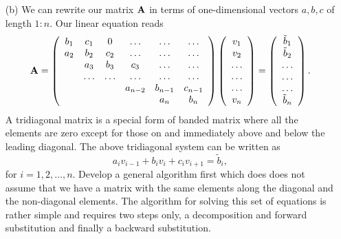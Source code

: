 \begin{enumerate}
\item[(b)]
We can rewrite our matrix ${\bf A}$ in terms of one-dimensional vectors $a,b,c$  
of length $1:n$. 
Our linear equation reads
\begin{equation}
    {\bf A} = \left(\begin{array}{cccccc}
                           b_1& c_1 & 0 &\dots   & \dots &\dots \\
                           a_2 & b_2 & c_2 &\dots &\dots &\dots \\
                           & a_3 & b_3 & c_3 & \dots & \dots \\
                           & \dots   & \dots &\dots   &\dots & \dots \\
                           &   &  &a_{n-2}  &b_{n-1}& c_{n-1} \\
                           &    &  &   &a_n & b_n \\
                      \end{array} \right)\left(\begin{array}{c}
                           v_1\\
                           v_2\\
                           \dots \\
                          \dots  \\
                          \dots \\
                           v_n\\
                      \end{array} \right)
  =\left(\begin{array}{c}
                           \tilde{b}_1\\
                           \tilde{b}_2\\
                           \dots \\
                           \dots \\
                          \dots \\
                           \tilde{b}_n\\
                      \end{array} \right).
\end{equation}
A tridiagonal matrix is a special form of banded matrix where all the elements are zero except for 
those on and immediately above and below the leading diagonal.
The above tridiagonal system   can be written as
\begin{equation}
  a_iv_{i-1}+b_iv_i+c_iv_{i+1} = \tilde{b}_i,
\end{equation}
for $i=1,2,\dots,n$. 
Develop a general algorithm first which does does not assume that we have a matrix with the same elements along the diagonal and the non-diagonal elements.
The algorithm for solving this set of equations is rather simple and requires two steps only, a decomposition 
and forward substitution and finally a backward substitution. 



\end{enumerate}
